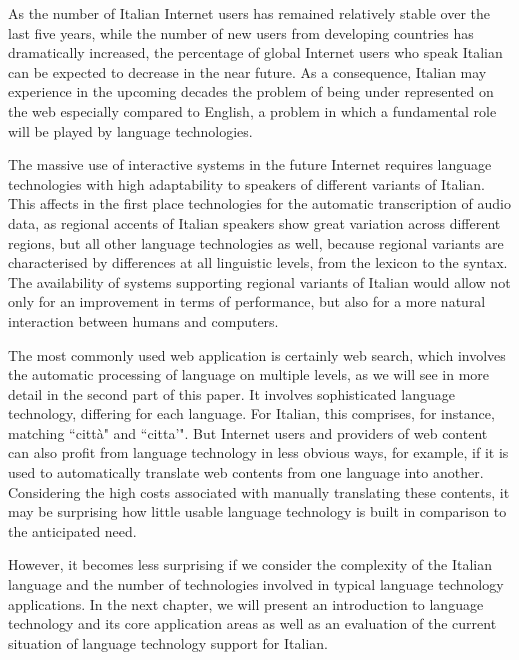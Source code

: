 \begin{multicols}{2}
As the number of Italian Internet users has remained relatively stable over
the last five years, while the number of new users from developing countries
has dramatically increased, the percentage of global Internet users who speak
Italian can be expected to decrease in the near future. As a consequence,
Italian may experience in the upcoming decades the problem of being under
represented on the web especially compared to English, a problem in
which a fundamental role will be played by language technologies.


The massive use of interactive systems in the future Internet requires
language technologies with high adaptability to speakers of different variants
of Italian. This affects in the first place technologies for the automatic
transcription of audio data, as regional accents of Italian speakers show
great variation across different regions, but all other language technologies
as well, because regional variants are characterised by differences at all
linguistic levels, from the lexicon to the syntax. The availability of systems
supporting regional variants of Italian would allow not only for an
improvement in terms of performance, but also for a more natural interaction
between humans and computers.
 
The most commonly used web application is certainly web search, which involves
the automatic processing of language on multiple levels, as we will see in
more detail in the second part of this paper. It involves sophisticated
language technology, differing for each language. For Italian, this comprises,
for instance, matching “citt\`{a}" and “citta'". But Internet
users and providers of web content can also profit from language technology in
less obvious ways, for example, if it is used to automatically translate web
contents from one language into another. Considering the high costs associated
with manually translating these contents, it may be surprising how little
usable language technology is built in comparison to the anticipated need.

However, it becomes less surprising if we consider the complexity of the
Italian language and the number of technologies involved in typical language 
technology applications. In the next chapter, we will present an introduction 
to language technology and its core application areas as well as an evaluation 
of the current situation of language technology support for Italian. 
\end{multicols}

